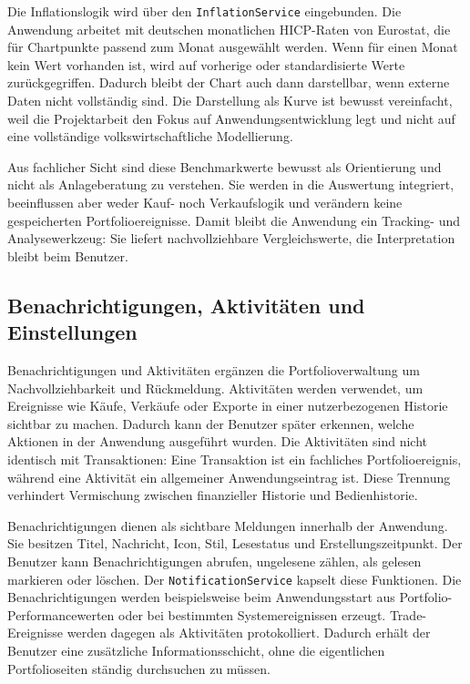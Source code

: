 \documentclass[12pt,a4paper]{article}
\begin{document}
Die Inflationslogik wird über den \texttt{InflationService} eingebunden. Die Anwendung arbeitet mit deutschen monatlichen HICP-Raten von Eurostat, die für Chartpunkte passend zum Monat ausgewählt werden. Wenn für einen Monat kein Wert vorhanden ist, wird auf vorherige oder standardisierte Werte zurückgegriffen. Dadurch bleibt der Chart auch dann darstellbar, wenn externe Daten nicht vollständig sind. Die Darstellung als Kurve ist bewusst vereinfacht, weil die Projektarbeit den Fokus auf Anwendungsentwicklung legt und nicht auf eine vollständige volkswirtschaftliche Modellierung.

Aus fachlicher Sicht sind diese Benchmarkwerte bewusst als Orientierung und nicht als Anlageberatung zu verstehen. Sie werden in die Auswertung integriert, beeinflussen aber weder Kauf- noch Verkaufslogik und verändern keine gespeicherten Portfolioereignisse. Damit bleibt die Anwendung ein Tracking- und Analysewerkzeug: Sie liefert nachvollziehbare Vergleichswerte, die Interpretation bleibt beim Benutzer.

\subsection{Benachrichtigungen, Aktivitäten und Einstellungen}

Benachrichtigungen und Aktivitäten ergänzen die Portfolioverwaltung um Nachvollziehbarkeit und Rückmeldung. Aktivitäten werden verwendet, um Ereignisse wie Käufe, Verkäufe oder Exporte in einer nutzerbezogenen Historie sichtbar zu machen. Dadurch kann der Benutzer später erkennen, welche Aktionen in der Anwendung ausgeführt wurden. Die Aktivitäten sind nicht identisch mit Transaktionen: Eine Transaktion ist ein fachliches Portfolioereignis, während eine Aktivität ein allgemeiner Anwendungseintrag ist. Diese Trennung verhindert Vermischung zwischen finanzieller Historie und Bedienhistorie.

Benachrichtigungen dienen als sichtbare Meldungen innerhalb der Anwendung. Sie besitzen Titel, Nachricht, Icon, Stil, Lesestatus und Erstellungszeitpunkt. Der Benutzer kann Benachrichtigungen abrufen, ungelesene zählen, als gelesen markieren oder löschen. Der \texttt{NotificationService} kapselt diese Funktionen. Die Benachrichtigungen werden beispielsweise beim Anwendungsstart aus Portfolio-Performancewerten oder bei bestimmten Systemereignissen erzeugt. Trade-Ereignisse werden dagegen als Aktivitäten protokolliert. Dadurch erhält der Benutzer eine zusätzliche Informationsschicht, ohne die eigentlichen Portfolioseiten ständig durchsuchen zu müssen.
\end{document}
